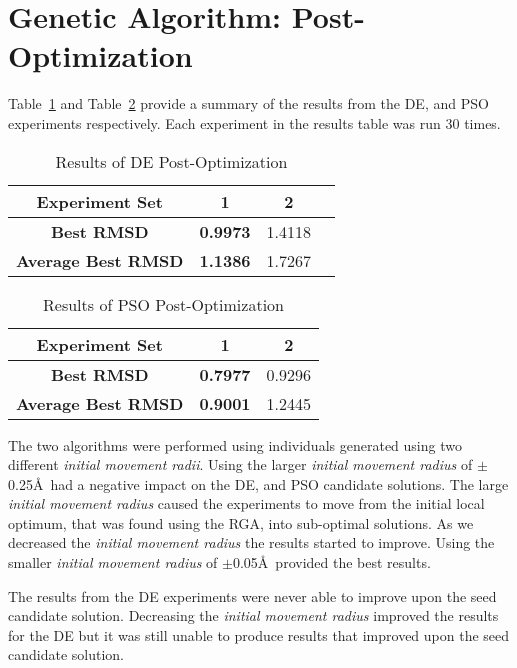\section{Genetic Algorithm: Post-Optimization}
\label{sec:post-op-analysis}

Table~\ref{table:post-op-de-results} and Table~\ref{table:post-op-pso-results} provide a summary of the results from the DE, and PSO experiments respectively. Each experiment in the results table was run 30 times. 

\begin{table}
	\centering
	\begin{tabular}{ | >{\bfseries}c | c | c | c | }
		\hline
		Experiment Set & 1 & 2 \\ \hline
		Best RMSD & \textbf{0.9973} & 1.4118 \\ \hline
		Average Best RMSD & \textbf{1.1386} & 1.7267 \\ \hline
	\end{tabular}
	\caption{Results of DE Post-Optimization}
	\label{table:post-op-de-results}
\end{table}

\begin{table}
	\centering
	\begin{tabular}{ | >{\bfseries}c | c | c | }
		\hline
		Experiment Set & 1 & 2 \\ \hline
		Best RMSD & \textbf{0.7977} & 0.9296 \\ \hline
		Average Best RMSD & \textbf{0.9001} & 1.2445 \\ \hline
	\end{tabular}
	\caption{Results of PSO Post-Optimization}
	\label{table:post-op-pso-results}
\end{table}

The two algorithms were performed using individuals generated using two different \textit{initial movement radii}. Using the larger \textit{initial movement radius} of $\pm$0.25\AA\ had a negative impact on the DE, and PSO candidate solutions. The large \textit{initial movement radius} caused the experiments to move from the initial local optimum, that was found using the RGA, into sub-optimal solutions. As we decreased the \textit{initial movement radius} the results started to improve. Using the smaller \textit{initial movement radius} of $\pm$0.05\AA\ provided the best results.

The results from the DE experiments were never able to improve upon the seed candidate solution. Decreasing the \textit{initial movement radius} improved the results for the DE but it was still unable to produce results that improved upon the seed candidate solution.

